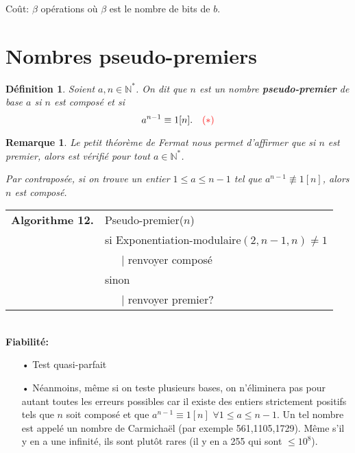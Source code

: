 \documentclass[10pt,a4paper]{report}
\newtheorem*{rem}{Remarque}
\newtheorem{Def}[thm]{Définition}
\begin{document}
Coût: $\beta$ opérations où $\beta$ est le nombre de bits de $b$.

\section{Nombres pseudo-premiers}

\begin{Def}
Soient $a,n \in \mathbb{N}^*$. On dit que $n$ est un nombre \textbf{pseudo-premier} de base $a$ si $n$ est composé et si 
$$    a^{n-1} \equiv 1 [n]. \quad {\color{red}(*)}   $$ 
\end{Def}

\begin{rem}
Le petit théorème de Fermat nous permet d'affirmer que si $n$ est premier, alors \rge{$(*)$} est vérifié pour tout $a \in \mathbb{N}^*$. \par 
Par contraposée, si on trouve un entier $1 \leqslant a \leqslant n-1$ tel que $a^{n-1} \not \equiv 1 [n]$, alors $n$ est composé.
\end{rem}


\begin{tabular}{ll}
\textbf{Algorithme 12.} & Pseudo-premier($n$)\\
           & si Exponentiation-modulaire$(2,n-1,n)\neq 1$ \\
           & \ \ \ {\rm |} renvoyer composé \\
           & sinon  \\
           & \ \ \ {\rm |}  renvoyer premier? 
\end{tabular}\\

\textbf{Fiabilité:}\begin{itemize}
\item[•]Test quasi-parfait 
\item[•] Néanmoins, même si on teste plusieurs bases, on n'éliminera pas pour autant toutes les erreurs possibles car il existe des entiers strictement positifs tels que $n$ soit composé et que $a^{n-1} \equiv 1 [n]$ $\forall 1 \leqslant a \leqslant n-1$. Un tel nombre est appelé un nombre de Carmichaël (par exemple 561,1105,1729). Même s'il y en a une infinité, ils sont plutôt rares (il y en a 255 qui sont $\leqslant 10^8$).
\end{itemize}
\end{document}
